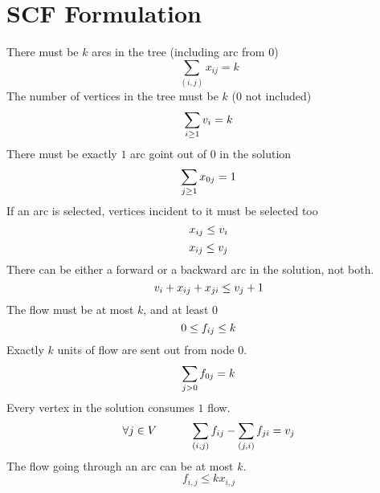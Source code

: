 \documentclass[a4paper]{article}
\numberwithin{equation}{section}
\begin{document}
\section{SCF Formulation}
There must be $k$ arcs in the tree (including arc from $0$)
\begin{equation}
	\sum_{(i,j)} x_{ij} = k
\end{equation}
The number of vertices in the tree must be $k$ ($0$ not included)
\begin{equation}
	\sum_{i \geq 1}v_i =k \\
\end{equation}
There must be exactly $1$ arc goint out of $0$ in the solution
\begin{equation}
	\sum_{j \geq 1} x_{0j}=1\\
\end{equation}
If an arc is selected, vertices incident to it must be selected too
\begin{equation}
	x_{ij} \leq v_i\\
\end{equation}
\begin{equation}
	x_{ij} \leq v_j\\
\end{equation}
There can be either a forward or a backward arc in the solution, not both.
\begin{equation}
	v_i + x_{ij} + x_{ji} \leq v_j + 1\\
\end{equation}
The flow must be at most $k$, and at least $0$
\begin{equation}
	0 \leq f_{ij} \leq k\\
\end{equation}
Exactly $k$ units of flow are sent out from node $0$.
\begin{equation}
	\sum_{j>0} f_{0j}=k \\
\end{equation}
Every vertex in the solution consumes $1$ flow.
\begin{equation}
  \forall j \in V \hspace{30pt}	\sum_{(i,j)} f_{ij} - \sum_{(j,i)} f_{ji} = v_j\\
\end{equation}
The flow going through an arc can be at most $k$.
\begin{equation}
	f_{i,j}\leq kx_{i,j}
\end{equation}
\end{document}
